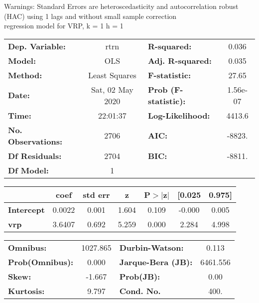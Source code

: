 Warnings: \newline
 [1] Standard Errors are heteroscedasticity and autocorrelation robust (HAC) using 1 lags and without small sample correction\\ 

regression model for VRP, k = 1 h = 1\begin{center}
\begin{tabular}{lclc}
\toprule
\textbf{Dep. Variable:}    &       rtrn       & \textbf{  R-squared:         } &     0.036   \\
\textbf{Model:}            &       OLS        & \textbf{  Adj. R-squared:    } &     0.035   \\
\textbf{Method:}           &  Least Squares   & \textbf{  F-statistic:       } &     27.65   \\
\textbf{Date:}             & Sat, 02 May 2020 & \textbf{  Prob (F-statistic):} &  1.56e-07   \\
\textbf{Time:}             &     22:01:37     & \textbf{  Log-Likelihood:    } &    4413.6   \\
\textbf{No. Observations:} &        2706      & \textbf{  AIC:               } &    -8823.   \\
\textbf{Df Residuals:}     &        2704      & \textbf{  BIC:               } &    -8811.   \\
\textbf{Df Model:}         &           1      & \textbf{                     } &             \\
\bottomrule
\end{tabular}
\begin{tabular}{lcccccc}
                   & \textbf{coef} & \textbf{std err} & \textbf{z} & \textbf{P$> |$z$|$} & \textbf{[0.025} & \textbf{0.975]}  \\
\midrule
\textbf{Intercept} &       0.0022  &        0.001     &     1.604  &         0.109        &       -0.000    &        0.005     \\
\textbf{vrp}       &       3.6407  &        0.692     &     5.259  &         0.000        &        2.284    &        4.998     \\
\bottomrule
\end{tabular}
\begin{tabular}{lclc}
\textbf{Omnibus:}       & 1027.865 & \textbf{  Durbin-Watson:     } &    0.113  \\
\textbf{Prob(Omnibus):} &   0.000  & \textbf{  Jarque-Bera (JB):  } & 6461.556  \\
\textbf{Skew:}          &  -1.667  & \textbf{  Prob(JB):          } &     0.00  \\
\textbf{Kurtosis:}      &   9.797  & \textbf{  Cond. No.          } &     400.  \\
\bottomrule
\end{tabular}
\end{center}

